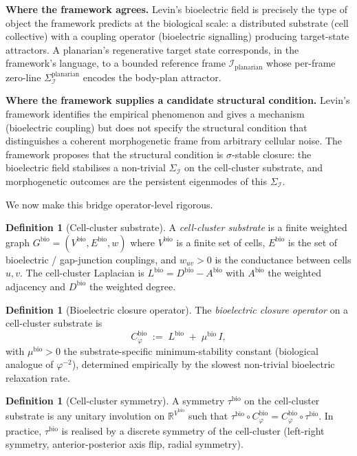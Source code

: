 \documentclass[11pt]{article}
\theoremstyle{plain}
\theoremstyle{definition}
\newtheorem{definition}[theorem]{Definition}
\theoremstyle{remark}
\newcommand{\Ical}{\mathcal{I}}
\newcommand{\Cph}{C_\varphi}
\begin{document}
\textbf{Where the framework agrees.} Levin's bioelectric field is precisely the type of object the framework predicts at the biological scale: a distributed substrate (cell collective) with a coupling operator (bioelectric signalling) producing target-state attractors. A planarian's regenerative target state corresponds, in the framework's language, to a bounded reference frame $\Ical_{\text{planarian}}$ whose per-frame zero-line $\Sigma_\Ical^{\text{planarian}}$ encodes the body-plan attractor.

\textbf{Where the framework supplies a candidate structural condition.} Levin's framework identifies the empirical phenomenon and gives a mechanism (bioelectric coupling) but does not specify the structural condition that distinguishes a coherent morphogenetic frame from arbitrary cellular noise. The framework proposes that the structural condition is $\sigma$-stable closure: the bioelectric field stabilises a non-trivial $\Sigma_\Ical$ on the cell-cluster substrate, and morphogenetic outcomes are the persistent eigenmodes of this $\Sigma_\Ical$.

We now make this bridge operator-level rigorous.

\begin{definition}[Cell-cluster substrate]\label{def:cell-cluster}
A \emph{cell-cluster substrate} is a finite weighted graph $G^{\mathrm{bio}} = (V^{\mathrm{bio}}, E^{\mathrm{bio}}, w)$ where $V^{\mathrm{bio}}$ is a finite set of cells, $E^{\mathrm{bio}}$ is the set of bioelectric / gap-junction couplings, and $w_{uv} > 0$ is the conductance between cells $u, v$. The cell-cluster Laplacian is $L^{\mathrm{bio}} = D^{\mathrm{bio}} - A^{\mathrm{bio}}$ with $A^{\mathrm{bio}}$ the weighted adjacency and $D^{\mathrm{bio}}$ the weighted degree.
\end{definition}

\begin{definition}[Bioelectric closure operator]\label{def:cph-bio}
The \emph{bioelectric closure operator} on a cell-cluster substrate is
\[
  \Cph^{\mathrm{bio}} \;:=\; L^{\mathrm{bio}} \;+\; \mu^{\mathrm{bio}} \, I,
\]
with $\mu^{\mathrm{bio}} > 0$ the substrate-specific minimum-stability constant (biological analogue of $\varphi^{-2}$), determined empirically by the slowest non-trivial bioelectric relaxation rate.
\end{definition}

\begin{definition}[Cell-cluster symmetry]\label{def:tau-bio}
A symmetry $\tau^{\mathrm{bio}}$ on the cell-cluster substrate is any unitary involution on $\mathbb{R}^{V^{\mathrm{bio}}}$ such that $\tau^{\mathrm{bio}} \circ \Cph^{\mathrm{bio}} = \Cph^{\mathrm{bio}} \circ \tau^{\mathrm{bio}}$. In practice, $\tau^{\mathrm{bio}}$ is realised by a discrete symmetry of the cell-cluster (left-right symmetry, anterior-posterior axis flip, radial symmetry).
\end{definition}
\end{document}
